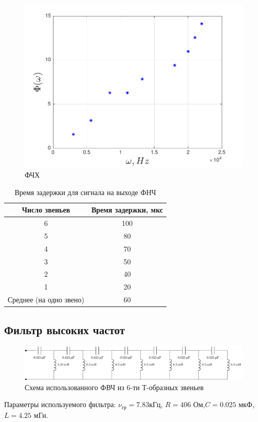 \begin{figure}[h!]
	\centering
	\includegraphics[]{graph/graph2}
	\caption{ФЧХ}
	\label{fig:figure2}
\end{figure}

\begin{table}[H]
\caption{\label{tab:1}Время задержки для сигнала на выходе ФНЧ}
	\begin{center}
		\begin{tabular}{|c|c|}
		\hline
		Число звеньев & Время задержки, мкс \\
		\hline
		6 & 100\\
		5 & 80\\
		4 & 70\\
		3 & 50\\
		2 & 40\\
		1 & 20\\
		\hline
		Среднее (на одно звено) & 60 \\
		\hline
		\end{tabular}
	\end{center}
\end{table}

\subsection{Фильтр высоких частот}
\begin{figure}[H]
	\centering
	\includegraphics[scale=0.75]{chem/chem5}
	\caption{ Схема использованного ФВЧ из 6-ти Т-образных звеньев}
	\label{fig:4}
\end{figure}
Параметры используемого фильтра: $\nu_{\text{гр}}=7.83$кГц, $R=406$ Ом,$C=0.025$ мкФ,
$L=4.25$ мГн. 

